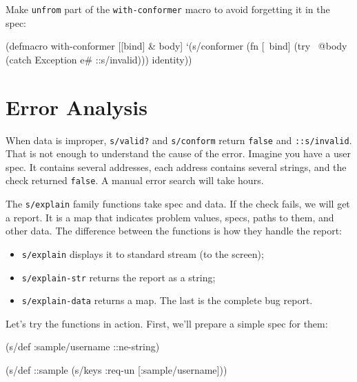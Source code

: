 Make \verb|unfrom| part of the \verb|with-conformer| macro to avoid forgetting it in the spec:

\begin{english}
  \begin{clojure}
(defmacro with-conformer
  [[bind] & body]
  `(s/conformer
    (fn [~bind]
      (try
        ~@body
        (catch Exception e#
          ::s/invalid)))
    identity))
  \end{clojure}
\end{english}

\section{Error Analysis}


\label{spec-explain}

When data is improper, \verb|s/valid?| and \verb|s/conform| return \verb|false| and \verb|::s/invalid|. That is not enough to understand the cause of the error. Imagine you have a user spec. It contains several addresses, each address contains several strings, and the check returned \verb|false|. A manual error search will take hours.

The \verb|s/explain| family functions take spec and data. If the check fails, we will get a report. It is a map that indicates problem values, specs, paths to them, and other data. The difference between the functions is how they handle the report:

\begin{itemize}


\item
  \verb|s/explain| displays it to standard stream (to the screen);

\item
  \verb|s/explain-str| returns the report as a string;

\item
  \verb|s/explain-data| returns a map. The last is the complete bug report.

\end{itemize}

Let's try the functions in action. First, we'll prepare a simple spec for them:

\begin{english}
  \begin{clojure}
(s/def :sample/username ::ne-string)

(s/def ::sample
  (s/keys :req-un [:sample/username]))
  \end{clojure}
\end{english}

